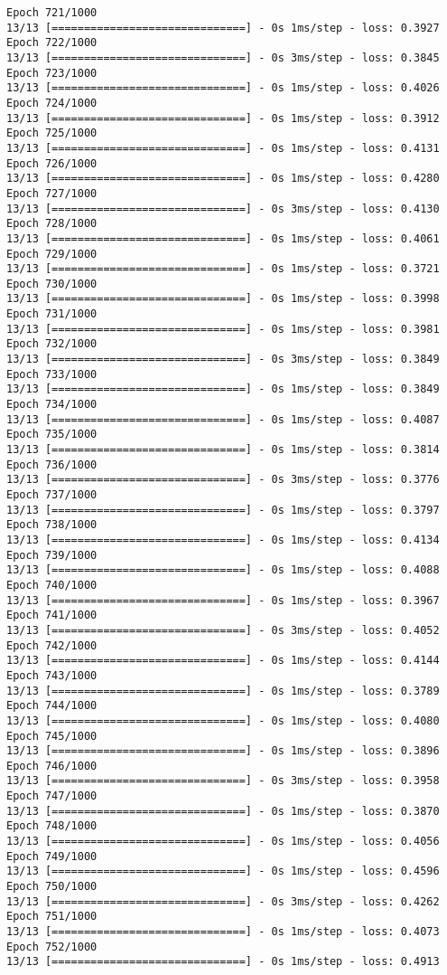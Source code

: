 \documentclass[11pt]{article}
\begin{document}
\begin{Verbatim}[commandchars=\\\{\}]
Epoch 721/1000
13/13 [==============================] - 0s 1ms/step - loss: 0.3927
Epoch 722/1000
13/13 [==============================] - 0s 3ms/step - loss: 0.3845
Epoch 723/1000
13/13 [==============================] - 0s 1ms/step - loss: 0.4026
Epoch 724/1000
13/13 [==============================] - 0s 1ms/step - loss: 0.3912
Epoch 725/1000
13/13 [==============================] - 0s 1ms/step - loss: 0.4131
Epoch 726/1000
13/13 [==============================] - 0s 1ms/step - loss: 0.4280
Epoch 727/1000
13/13 [==============================] - 0s 3ms/step - loss: 0.4130
Epoch 728/1000
13/13 [==============================] - 0s 1ms/step - loss: 0.4061
Epoch 729/1000
13/13 [==============================] - 0s 1ms/step - loss: 0.3721
Epoch 730/1000
13/13 [==============================] - 0s 1ms/step - loss: 0.3998
Epoch 731/1000
13/13 [==============================] - 0s 1ms/step - loss: 0.3981
Epoch 732/1000
13/13 [==============================] - 0s 3ms/step - loss: 0.3849
Epoch 733/1000
13/13 [==============================] - 0s 1ms/step - loss: 0.3849
Epoch 734/1000
13/13 [==============================] - 0s 1ms/step - loss: 0.4087
Epoch 735/1000
13/13 [==============================] - 0s 1ms/step - loss: 0.3814
Epoch 736/1000
13/13 [==============================] - 0s 3ms/step - loss: 0.3776
Epoch 737/1000
13/13 [==============================] - 0s 1ms/step - loss: 0.3797
Epoch 738/1000
13/13 [==============================] - 0s 1ms/step - loss: 0.4134
Epoch 739/1000
13/13 [==============================] - 0s 1ms/step - loss: 0.4088
Epoch 740/1000
13/13 [==============================] - 0s 1ms/step - loss: 0.3967
Epoch 741/1000
13/13 [==============================] - 0s 3ms/step - loss: 0.4052
Epoch 742/1000
13/13 [==============================] - 0s 1ms/step - loss: 0.4144
Epoch 743/1000
13/13 [==============================] - 0s 1ms/step - loss: 0.3789
Epoch 744/1000
13/13 [==============================] - 0s 1ms/step - loss: 0.4080
Epoch 745/1000
13/13 [==============================] - 0s 1ms/step - loss: 0.3896
Epoch 746/1000
13/13 [==============================] - 0s 3ms/step - loss: 0.3958
Epoch 747/1000
13/13 [==============================] - 0s 1ms/step - loss: 0.3870
Epoch 748/1000
13/13 [==============================] - 0s 1ms/step - loss: 0.4056
Epoch 749/1000
13/13 [==============================] - 0s 1ms/step - loss: 0.4596
Epoch 750/1000
13/13 [==============================] - 0s 3ms/step - loss: 0.4262
Epoch 751/1000
13/13 [==============================] - 0s 1ms/step - loss: 0.4073
Epoch 752/1000
13/13 [==============================] - 0s 1ms/step - loss: 0.4913

\end{Verbatim}
\end{document}
